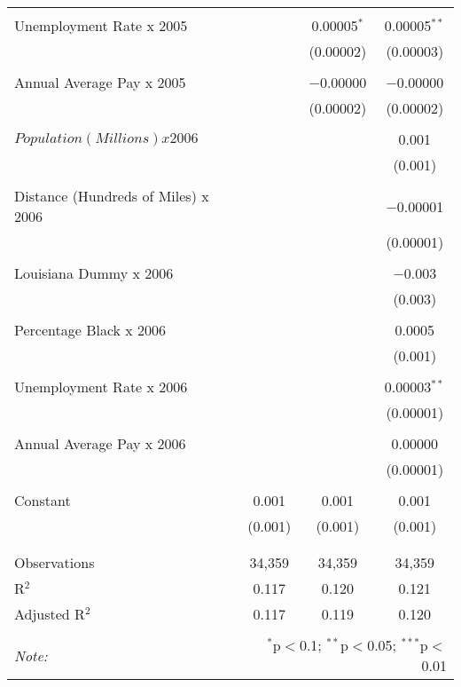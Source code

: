 \documentclass[]{article}
\begin{document}
\begin{table}[!htbp]
\begin{tabular}{@{\extracolsep{5pt}}lccc}
  & & & \\ 
 Unemployment Rate x 2005 &  & 0.00005$^{*}$ & 0.00005$^{**}$ \\ 
  &  & (0.00002) & (0.00003) \\ 
  & & & \\ 
 Annual Average Pay x 2005 &  & $-$0.00000 & $-$0.00000 \\ 
  &  & (0.00002) & (0.00002) \\ 
  & & & \\ 
 $Population (Millions) x 2006$ &  &  & 0.001 \\ 
  &  &  & (0.001) \\ 
  & & & \\ 
 Distance (Hundreds of Miles) x 2006 &  &  & $-$0.00001 \\ 
  &  &  & (0.00001) \\ 
  & & & \\ 
 Louisiana Dummy x 2006 &  &  & $-$0.003 \\ 
  &  &  & (0.003) \\ 
  & & & \\ 
 Percentage Black x 2006 &  &  & 0.0005 \\ 
  &  &  & (0.001) \\ 
  & & & \\ 
 Unemployment Rate x 2006 &  &  & 0.00003$^{**}$ \\ 
  &  &  & (0.00001) \\ 
  & & & \\ 
 Annual Average Pay x 2006 &  &  & 0.00000 \\ 
  &  &  & (0.00001) \\ 
  & & & \\ 
 Constant & 0.001 & 0.001 & 0.001 \\ 
  & (0.001) & (0.001) & (0.001) \\ 
  & & & \\ 
\hline \\[-1.8ex] 
Observations & 34,359 & 34,359 & 34,359 \\ 
R$^{2}$ & 0.117 & 0.120 & 0.121 \\ 
Adjusted R$^{2}$ & 0.117 & 0.119 & 0.120 \\
\hline \\[-1.8ex] 
\textit{Note:}  & \multicolumn{3}{r}{$^{*}$p$<$0.1; $^{**}$p$<$0.05; $^{***}$p$<$0.01} \\ 
\end{tabular} 
\end{table}

\clearpage
\end{document}
